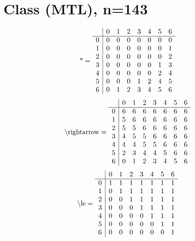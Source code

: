 \documentclass[11pt]{article}
\begin{document}
\section{Class (MTL), n=143}
\[\text{*} = 
\begin{array}{r | r r r r r r r}
 & 0 & 1 & 2 & 3 & 4 & 5 & 6 \\ \hline
0 & 0 & 0 & 0 & 0 & 0 & 0 & 0 \\
1 & 0 & 0 & 0 & 0 & 0 & 0 & 1 \\
2 & 0 & 0 & 0 & 0 & 0 & 0 & 2 \\
3 & 0 & 0 & 0 & 0 & 0 & 1 & 3 \\
4 & 0 & 0 & 0 & 0 & 0 & 2 & 4 \\
5 & 0 & 0 & 0 & 1 & 2 & 4 & 5 \\
6 & 0 & 1 & 2 & 3 & 4 & 5 & 6 \\
\end{array}
\]
\[\text{\textbackslash rightarrow} = 
\begin{array}{r | r r r r r r r}
 & 0 & 1 & 2 & 3 & 4 & 5 & 6 \\ \hline
0 & 6 & 6 & 6 & 6 & 6 & 6 & 6 \\
1 & 5 & 6 & 6 & 6 & 6 & 6 & 6 \\
2 & 5 & 5 & 6 & 6 & 6 & 6 & 6 \\
3 & 4 & 5 & 5 & 6 & 6 & 6 & 6 \\
4 & 4 & 4 & 5 & 5 & 6 & 6 & 6 \\
5 & 2 & 3 & 4 & 4 & 5 & 6 & 6 \\
6 & 0 & 1 & 2 & 3 & 4 & 5 & 6 \\
\end{array}
\]
\[\text{\textbackslash le} = 
\begin{array}{r | r r r r r r r}
 & 0 & 1 & 2 & 3 & 4 & 5 & 6 \\ \hline
0 & 1 & 1 & 1 & 1 & 1 & 1 & 1 \\
1 & 0 & 1 & 1 & 1 & 1 & 1 & 1 \\
2 & 0 & 0 & 1 & 1 & 1 & 1 & 1 \\
3 & 0 & 0 & 0 & 1 & 1 & 1 & 1 \\
4 & 0 & 0 & 0 & 0 & 1 & 1 & 1 \\
5 & 0 & 0 & 0 & 0 & 0 & 1 & 1 \\
6 & 0 & 0 & 0 & 0 & 0 & 0 & 1 \\
\end{array}
\]
\end{document}
